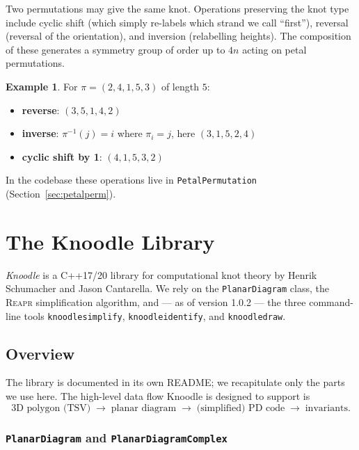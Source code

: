 \documentclass[11pt,oneside]{report}
\theoremstyle{definition}
\newtheorem{example}[theorem]{Example}
\begin{document}
Two permutations may give the same knot. Operations preserving the knot type
include cyclic shift (which simply re-labels which strand we call ``first''),
reversal (reversal of the orientation), and inversion (relabelling heights).
The composition of these generates a symmetry group of order up to $4n$ acting
on petal permutations.

\begin{example}\label{ex:permops}
For $\pi = (2,4,1,5,3)$ of length $5$:
\begin{itemize}[leftmargin=2em]
\item \textbf{reverse}: $(3,5,1,4,2)$
\item \textbf{inverse}: $\pi^{-1}(j) = i$ where $\pi_i = j$, here $(3,1,5,2,4)$
\item \textbf{cyclic shift by 1}: $(4,1,5,3,2)$
\end{itemize}
\end{example}

In the codebase these operations live in \texttt{PetalPermutation}
(Section~\ref{sec:petalperm}).

\chapter{The Knoodle Library}\label{chap:knoodle}

\emph{Knoodle} is a C++17/20 library for computational knot theory by
Henrik Schumacher and Jason Cantarella. We rely on the \texttt{PlanarDiagram}
class, the \textsc{Reapr} simplification algorithm, and --- as of version
1.0.2 --- the three command-line tools \texttt{knoodlesimplify},
\texttt{knoodleidentify}, and \texttt{knoodledraw}.

\section{Overview}

The library is documented in its own README; we recapitulate only the parts we
use here. The high-level data flow Knoodle is designed to support is
\[
\text{3D polygon (TSV)} \;\to\; \text{planar diagram} \;\to\; \text{(simplified) PD code} \;\to\; \text{invariants}.
\]

\subsection{\texttt{PlanarDiagram} and \texttt{PlanarDiagramComplex}}
\end{document}
